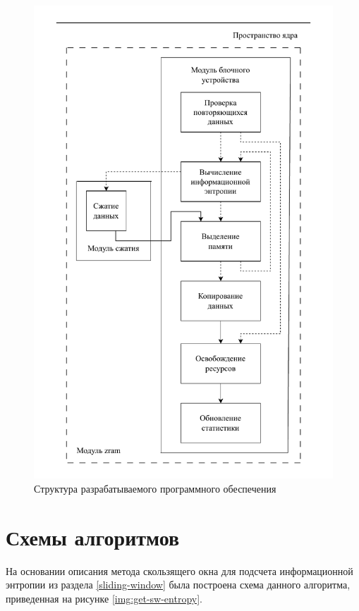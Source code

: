 \begin{figure}[H]
	\begin{center}
		\includegraphics[scale=0.6]{inc/img/structure.pdf}
	\end{center}
	\captionsetup{justification=centering}
	\caption{Структура разрабатываемого программного обеспечения}
	\label{img:structure}
\end{figure}

\section{Схемы алгоритмов}

На основании описания метода скользящего окна для подсчета информационной энтропии из раздела \ref{sliding-window} была построена схема данного алгоритма, приведенная на рисунке \ref{img:get-sw-entropy}.

